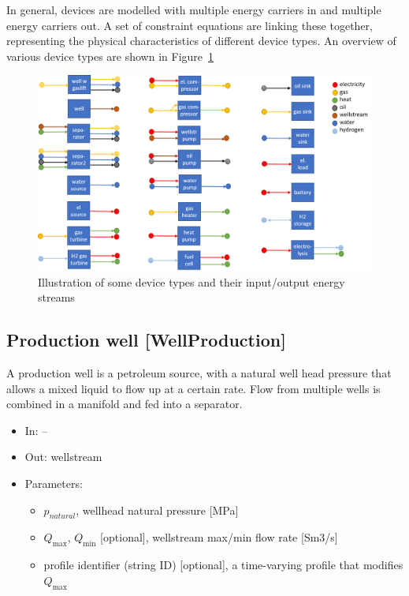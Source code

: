 \documentclass[12pt]{article}
\begin{document}
In general, devices are modelled with multiple energy carriers in and multiple energy carriers out. A set of constraint equations are linking these together, representing the physical characteristics of different device types. An overview of various device types are shown in Figure~\ref{fig:devicetypes}


\begin{figure}[]
\centering
		\includegraphics[width=\columnwidth]{./media/device_types.png}
		\caption{Illustration of some device types and their input/output energy streams }
		\label{fig:devicetypes}
\end{figure}



\subsection{Production well [WellProduction]}

A production well is a petroleum source, with a natural well head pressure that allows a mixed liquid to flow up at a certain rate. Flow from multiple wells is combined in a manifold and fed into a separator.

\begin{itemize}
\item In: --
\item Out: wellstream
\item Parameters:
\begin{itemize}[noitemsep,topsep=0pt]
	\item $p_{natural}$,  wellhead natural pressure [MPa]
	\item $Q_\text{max}$, $Q_\text{min}$ [optional], wellstream max/min flow rate [Sm3/s]
	\item profile identifier (string ID) [optional], a time-varying profile that modifies $Q_\text{max}$
\end{itemize}
\end{itemize}
\end{document}
